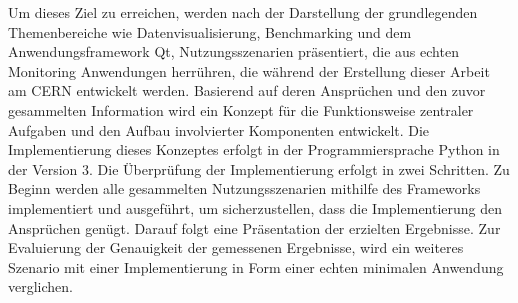 Um dieses Ziel zu erreichen, werden nach der Darstellung der grundlegenden
Themenbereiche wie Datenvisualisierung, Benchmarking und dem Anwendungsframework
Qt, Nutzungsszenarien präsentiert, die aus echten Monitoring Anwendungen
herrühren, die während der Erstellung dieser Arbeit am CERN entwickelt werden.
Basierend auf deren Ansprüchen und den zuvor gesammelten Information wird ein
Konzept für die Funktionsweise zentraler Aufgaben und den Aufbau involvierter
Komponenten entwickelt. Die Implementierung dieses Konzeptes erfolgt in der
Programmiersprache Python in der Version 3. Die Überprüfung der Implementierung
erfolgt in zwei Schritten. Zu Beginn werden alle gesammelten Nutzungsszenarien
mithilfe des Frameworks implementiert und ausgeführt, um sicherzustellen, dass
die Implementierung den Ansprüchen genügt. Darauf folgt eine Präsentation der
erzielten Ergebnisse. Zur Evaluierung der Genauigkeit der gemessenen Ergebnisse,
wird ein weiteres Szenario mit einer Implementierung in Form einer echten
minimalen Anwendung verglichen.
